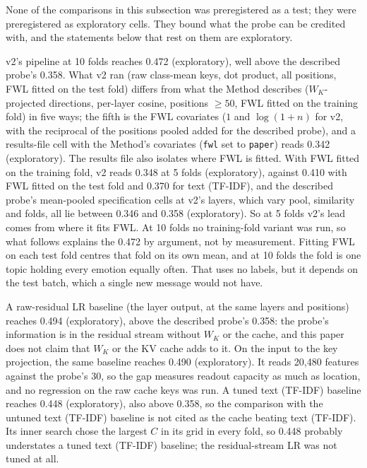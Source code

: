 \documentclass[11pt,a4paper]{article}
\begin{document}
None of the comparisons in this subsection was preregistered as a test; they were preregistered as exploratory cells. They bound what the probe can be credited with, and the statements below that rest on them are exploratory.

v2's pipeline at 10 folds reaches 0.472 (exploratory), well above the described probe's 0.358. What v2 ran (raw class-mean keys, dot product, all positions, FWL fitted on the test fold) differs from what the Method describes ($W_K$-projected directions, per-layer cosine, positions $\geq 50$, FWL fitted on the training fold) in five ways; the fifth is the FWL covariates ($1$ and $\log(1+n)$ for v2, with the reciprocal of the positions pooled added for the described probe), and a results-file cell with the Method's covariates (\texttt{fwl} set to \texttt{paper}) reads 0.342 (exploratory). The results file also isolates where FWL is fitted. With FWL fitted on the training fold, v2 reads 0.348 at 5 folds (exploratory), against 0.410 with FWL fitted on the test fold and 0.370 for text (TF-IDF), and the described probe's mean-pooled specification cells at v2's layers, which vary pool, similarity and folds, all lie between 0.346 and 0.358 (exploratory). So at 5 folds v2's lead comes from where it fits FWL. At 10 folds no training-fold variant was run, so what follows explains the 0.472 by argument, not by measurement. Fitting FWL on each test fold centres that fold on its own mean, and at 10 folds the fold is one topic holding every emotion equally often. That uses no labels, but it depends on the test batch, which a single new message would not have.

A raw-residual LR baseline (the layer output, at the same layers and positions) reaches 0.494 (exploratory), above the described probe's 0.358: the probe's information is in the residual stream without $W_K$ or the cache, and this paper does not claim that $W_K$ or the KV cache adds to it. On the input to the key projection, the same baseline reaches 0.490 (exploratory). It reads 20{,}480 features against the probe's 30, so the gap measures readout capacity as much as location, and no regression on the raw cache keys was run. A tuned text (TF-IDF) baseline reaches 0.448 (exploratory), also above 0.358, so the comparison with the untuned text (TF-IDF) baseline is not cited as the cache beating text (TF-IDF). Its inner search chose the largest $C$ in its grid in every fold, so 0.448 probably understates a tuned text (TF-IDF) baseline; the residual-stream LR was not tuned at all.
\end{document}
